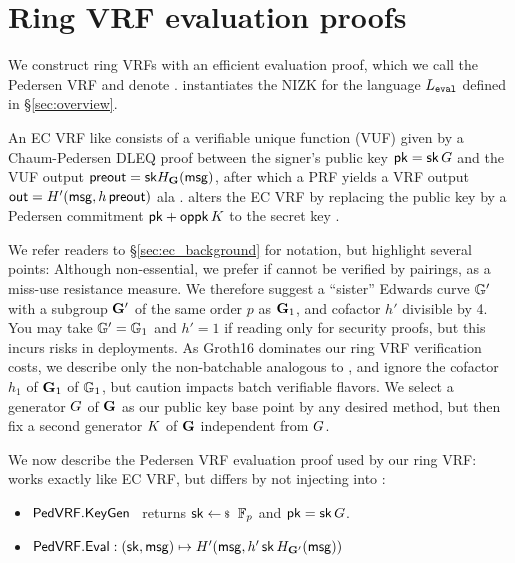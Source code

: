 \section{Ring VRF evaluation proofs} %
\label{sec:pederson_vrf}

We construct ring VRFs with an efficient evaluation proof, which
we call the Pedersen VRF and denote \PedVRF.
\PedVRF instantiates the NIZK for the language $L_{\mathtt{eval}}$ defined in \S\ref{sec:overview}.

An EC VRF like \cite{nsec5,VXEd25519,draft-irtf-cfrg-vrf-10}
consists of a verifiable unique function (VUF) given by a
Chaum-Pedersen DLEQ proof between the signer's public key $\mathsf{pk} = \mathsf{sk} \, G$ and
 the VUF output ${\mathsf{preout}} = \mathsf{sk} H_{{\mathbf{G}}}(\mathsf{msg})$,
after which a PRF  yields a VRF output
 ${\mathsf{out}} = H'(\mathsf{msg}, h \, {\mathsf{preout}})$ ala \cite[Proposition 1]{vrf_micali}.
%
\PedVRF alters the EC VRF by replacing the public key by
a Pedersen commitment $\mathsf{pk} + \mathsf{oppk} \, K$ to the secret key \sk.%


We refer readers to \S\ref{sec:ec_background} for notation,
 but highlight several points: 
%
Although non-essential, we prefer if \PreOut cannot be verified
by pairings, as a miss-use resistance measure.
We therefore suggest a ``sister'' Edwards curve ${\mathbb{G}}'$ with
 a subgroup ${\mathbf{G}}'$ of the same order $p$ as ${\mathbf{G}}_1$,
 and cofactor $h'$ divisible by 4.
You may take ${\mathbb{G}}' = {\mathbb{G}}_1$ and $h' = 1$ if reading only for
security proofs, but this incurs risks in deployments.
%
As Groth16 dominates our ring VRF verification costs, we describe only
the non-batchable \PedVRF analogous to \cite{nsec5,VXEd25519,draft-irtf-cfrg-vrf-10},
and ignore the cofactor $h_1$ of ${\mathbf{G}}_1$ of ${\mathbb{G}}_1$, 
but caution \cite{HdVBatchEd25519} impacts batch verifiable flavors.
%
We select a generator $G$ of ${\mathbf{G}}$ as our public key base point
 by any desired method, but then
fix a second generator $K$ of ${\mathbf{G}}$ independent from $G$.

We now describe the Pedersen VRF \PedVRF evaluation proof used by our ring VRF:
%
\KeyGen works exactly like EC VRF, but
 \Eval differs by not injecting \pk into \msg:
\begin{itemize}
\item ${\mathsf{PedVRF}}.{\mathsf{KeyGen}}$ \, returns $\sk \leftsample \F_p$ and $\mathsf{pk} = \mathsf{sk} \, G$.
\item ${\mathsf{PedVRF}}.{\mathsf{Eval}} : (\mathsf{sk},\mathsf{msg}) \mapsto H'(\mathsf{msg}, h' \, \mathsf{sk} \, H_{{\mathbf{G}}'}(\mathsf{msg}))$
\end{itemize}

